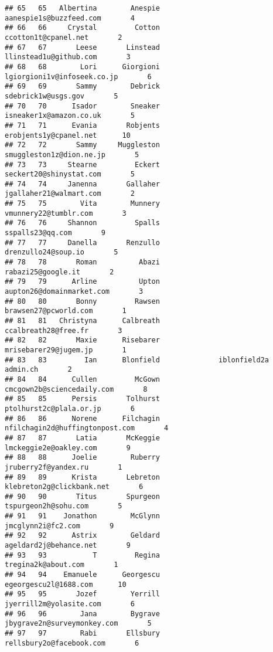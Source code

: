 \documentclass[]{article}
\begin{document}
\begin{verbatim}
## 65   65   Albertina        Anespie            aanespie1s@buzzfeed.com       4
## 66   66     Crystal         Cotton               ccotton1t@cpanel.net       2
## 67   67       Leese       Linstead             llinstead1u@github.com       3
## 68   68        Lori      Giorgioni        lgiorgioni1v@infoseek.co.jp       6
## 69   69       Sammy        Debrick                sdebrick1w@usgs.gov       5
## 70   70      Isador        Sneaker            isneaker1x@amazon.co.uk       5
## 71   71      Evania       Robjents             erobjents1y@cpanel.net      10
## 72   72       Sammy     Muggleston           smuggleston1z@dion.ne.jp       5
## 73   73     Stearne         Eckert            seckert20@shinystat.com       5
## 74   74     Janenna       Gallaher            jgallaher21@walmart.com       2
## 75   75        Vita        Munnery              vmunnery22@tumblr.com       3
## 76   76     Shannon         Spalls                   sspalls23@qq.com       9
## 77   77     Danella       Renzullo                drenzullo24@soup.io       5
## 78   78       Roman          Abazi                 rabazi25@google.it       2
## 79   79      Arline          Upton          aupton26@domainmarket.com       3
## 80   80       Bonny         Rawsen              brawsen27@pcworld.com       1
## 81   81   Christyna      Calbreath               ccalbreath28@free.fr       3
## 82   82       Maxie      Risebarer              mrisebarer29@jugem.jp       1
## 83   83         Ian      Blonfield              iblonfield2a admin.ch       2
## 84   84      Cullen         McGown         cmcgown2b@sciencedaily.com       8
## 85   85      Persis       Tolhurst            ptolhurst2c@plala.or.jp       6
## 86   86      Norene      Filchagin    nfilchagin2d@huffingtonpost.com       4
## 87   87       Latia       McKeggie             lmckeggie2e@oakley.com       9
## 88   88      Joelie        Ruberry               jruberry2f@yandex.ru       1
## 89   89      Krista       Lebreton          klebreton2g@clickbank.net       6
## 90   90       Titus       Spurgeon               tspurgeon2h@sohu.com       5
## 91   91    Jonathon        McGlynn                 jmcglynn2i@fc2.com       9
## 92   92      Astrix        Geldard             ageldard2j@behance.net       9
## 93   93           T         Regina                tregina2k@about.com       1
## 94   94    Emanuele      Georgescu              egeorgescu2l@1688.com      10
## 95   95       Jozef        Yerrill            jyerrill2m@yolasite.com       6
## 96   96        Jana        Bygrave        jbygrave2n@surveymonkey.com       5
## 97   97        Rabi       Ellsbury           rellsbury2o@facebook.com       6

\end{verbatim}
\end{document}
